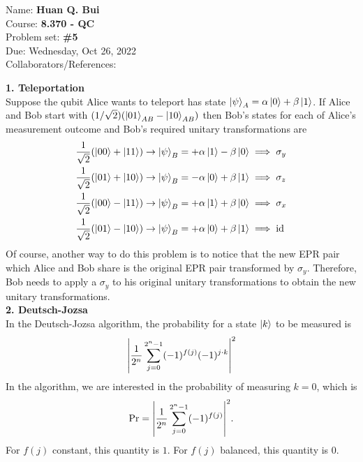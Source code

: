 \documentclass{article}
\theoremstyle{definition}
\newcommand{\al}{\alpha}
\newcommand{\be}{\beta}
\newcommand{\f}[2]{\frac{#1}{#2}}
\begin{document}
\begin{framed}
\noindent Name: \textbf{Huan Q. Bui}\\
Course: \textbf{8.370 - QC}\\
Problem set: \textbf{\#5}\\
Due: Wednesday, Oct 26, 2022\\
Collaborators/References: 
\end{framed}




\noindent \textbf{1. Teleportation} \\

\noindent Suppose the qubit Alice wants to teleport has state $\ket{\psi}_A = \al\ket{0}+ \be\ket{1}$. If Alice and Bob start with $(1/\sqrt{2})(\ket{01}_{AB} - \ket{10}_{AB})$ then Bob's states for each of Alice's measurement outcome and Bob's required unitary transformations are
\begin{align*}
	&\f{1}{\sqrt{2}}(\ket{00} + \ket{11}) \to \ket{\psi}_B = +\al\ket{1} - \be\ket{0} \implies \sigma_y\\
	&\f{1}{\sqrt{2}}(\ket{01} + \ket{10}) \to \ket{\psi}_B = -\al\ket{0} + \be\ket{1} \implies \sigma_z \\
	&\f{1}{\sqrt{2}}(\ket{00} - \ket{11}) \to \ket{\psi}_B = +\al\ket{1} + \be\ket{0} \implies \sigma_x\\
	&\f{1}{\sqrt{2}}(\ket{01} - \ket{10}) \to \ket{\psi}_B = +\al\ket{0} + \be\ket{1} \implies \text{id}\\
\end{align*}
Of course, another way to do this problem is to notice that the new EPR pair which Alice and Bob share is the original EPR pair transformed by $\sigma_y$. Therefore, Bob needs to apply a $\sigma_y$ to his original unitary transformations to obtain the new unitary transformations. \\



\noindent \textbf{2. Deutsch-Jozsa}\\ 


In the Deutsch-Jozsa algorithm, the probability for a state $\ket{k}$ to be measured is 
\begin{align*}
	\abs{\f{1}{2^n} \sum^{2^n-1}_{j=0}  (-1)^{f(j)}  (-1)^{j\cdot k} }^2
\end{align*}
In the algorithm, we are interested in the probability of measuring $k=0$, which is 
\begin{align*}
	\Pr = \abs{\f{1}{2^n} \sum^{2^n-1}_{j=0}  (-1)^{f(j)}}^2.
\end{align*}
For $f(j)$ constant, this quantity is $1$. For $f(j)$ balanced, this quantity is $0$. \\
\end{document}

